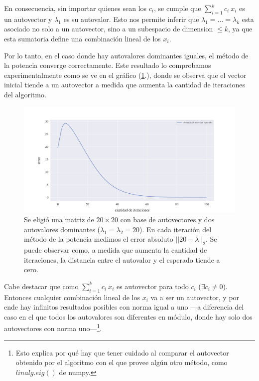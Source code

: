 \vspace{1em}
En consecuencia, sin importar quienes sean los $c_i$, se cumple que $\sum_{i=1}^{k} c_i\ x_i$ es un autovector y $\lambda_1$ es su autovalor. Esto nos permite inferir que $\lambda_1 = ... =\lambda_k$ esta asociado no solo a un autovector, sino a un subespacio de dimension $ \leq k$, ya que esta sumatoria define una combinación lineal de los $x_i$.   

\vspace{1em}
Por lo tanto, en el caso donde hay autovalores dominantes iguales, el método de la potencia converge correctamente. Este resultado lo comprobamos experimentalmente como se ve en el gráfico (\ref{fig:autovalor_repetido}.), donde se observa que el vector inicial tiende a un autovector a medida que aumenta la cantidad de iteraciones del algoritmo.

\vspace{1em}
\begin{figure}[!htbp]
    \includegraphics[scale=0.45]{files/src/.media/op_autovalor_repetido.png}
    \caption{Se eligió una matriz de $20 \times 20$ con base de autovectores y dos autovalores dominantes ($\lambda_1 = \lambda_2 = 20$). En cada iteración del método de la potencia medimos el error absoluto $||20 - \bar{\lambda}||_2$. Se puede observar como, a medida que aumenta la cantidad de iteraciones, la distancia entre el autovalor y el esperado tiende a cero.}
    \label{fig:autovalor_repetido}
\end{figure}

\vspace{1em}
Cabe destacar que como $\sum_{i=1}^{k} c_i\ x_i$ es autovector para todo $c_i$ ($\exists c_i \neq 0$). Entonces cualquier combinación lineal de los $x_i$ va a ser un autovector, y por ende hay infinitos resultados posibles con norma igual a uno ---a diferencia del caso en el que todos los autovalores son diferentes en módulo, donde hay solo dos autovectores con norma uno---\footnote{Esto explica por qué hay que tener cuidado al comparar el autovector obtenido por el algoritmo con el que provee algún otro método, como $linalg.eig()$ de numpy.}.


